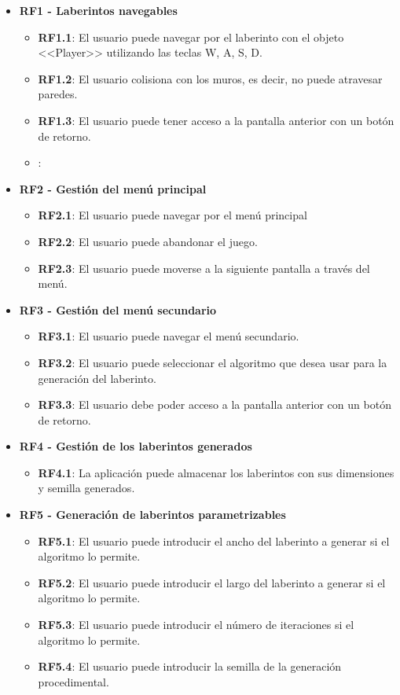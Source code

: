 \begin{itemize}
	\item \textbf{RF1 - Laberintos navegables}
		\begin{itemize}
  			\item \textbf{RF1.1}: El usuario puede navegar por el laberinto con el objeto <<Player>> utilizando las teclas W, A, S, D.
            \item \textbf{RF1.2}: El usuario colisiona con los muros, es decir, no puede atravesar paredes.
			\item \textbf{RF1.3}: El usuario puede tener acceso a la pantalla anterior con un botón de retorno.
            \item {}:
		\end{itemize}
    \item \textbf{RF2 - Gestión del menú principal}
		\begin{itemize}
  			\item \textbf{RF2.1}: El usuario puede navegar por el menú principal
			\item \textbf{RF2.2}: El usuario puede abandonar el juego.
			\item \textbf{RF2.3}: El usuario puede moverse a la siguiente pantalla a través del menú.
		\end{itemize}
    \item \textbf{RF3 - Gestión del menú secundario}
		\begin{itemize}
  			\item \textbf{RF3.1}: El usuario puede navegar el menú secundario.
			\item \textbf{RF3.2}: El usuario puede seleccionar el algoritmo que desea usar para la generación del laberinto.
			\item \textbf{RF3.3}: El usuario debe poder acceso a la pantalla anterior con un botón de retorno.
		\end{itemize}
    \item \textbf{RF4 - Gestión de los laberintos generados}
		\begin{itemize}
  			\item \textbf{RF4.1}: La aplicación puede almacenar los laberintos con sus dimensiones y  semilla generados.
		\end{itemize}
    \item \textbf{RF5 - Generación de laberintos parametrizables}
		\begin{itemize}
  			\item \textbf{RF5.1}: El usuario puede introducir el ancho del laberinto a generar si el algoritmo lo permite.
            \item \textbf{RF5.2}: El usuario puede introducir el largo del laberinto a generar si el algoritmo lo permite.
            \item \textbf{RF5.3}: El usuario puede introducir el número de iteraciones si el algoritmo lo permite.
            \item \textbf{RF5.4}: El usuario puede introducir la semilla de la generación procedimental.
		\end{itemize}
\end{itemize}


